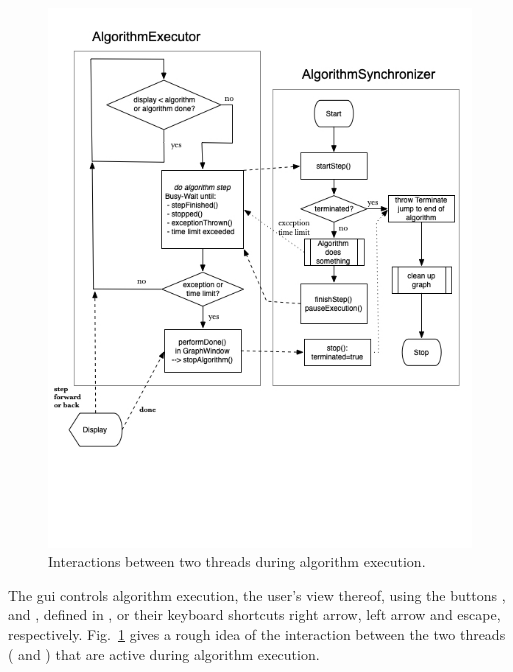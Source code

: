 \begin{figure}
  \begin{center}
    \includegraphics[width=\textwidth]{Developer/X-algorithm_execution}
  \end{center}
  \caption{Interactions between two threads during algorithm execution.}
  \label{fig:algorithm_execution}
\end{figure}

The gui controls algorithm execution, the user's view thereof, using the
buttons ,  and , defined in
, or their keyboard shortcuts right arrow, left
arrow and escape, respectively.
Fig.~\ref{fig:algorithm_execution} gives a rough idea of the interaction
between the two threads ( and
) that are active during algorithm execution.

